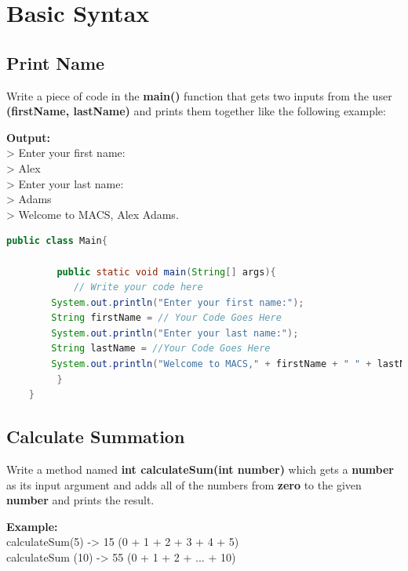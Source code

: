 \documentclass[12pt , a4paper]{article}
\newcommand{\hl}[1]{\colorbox{coolblack}{\color{cream}\textbf{#1}\color{black}}}
\begin{document}
\section{Basic Syntax}

	\subsection{Print Name}
Write a piece of code in the \textbf{main()} function that gets two inputs from the user \textbf{(firstName, lastName)} and prints them together like the following example:
 

	\begin{tcolorbox}
	\textbf{Output:}\\
	> Enter your first name:\\
	> Alex\\
	> Enter your last name:\\
	> Adams\\
	> Welcome to MACS, Alex Adams.
	\end{tcolorbox}

	\begin{lstlisting}[language=Java]
	public class Main{

	     public static void main(String[] args){
	        // Write your code here
		System.out.println("Enter your first name:");
		String firstName = // Your Code Goes Here 
		System.out.println("Enter your last name:");
		String lastName = //Your Code Goes Here
		System.out.println("Welcome to MACS," + firstName + " " + lastName);
	     }
	}
	\end{lstlisting}


	\newpage
	\subsection{Calculate Summation}
Write a method named \textbf{int calculateSum(int number)} which gets a \hl{number} as its input argument and adds all of the numbers from \textbf{zero} to the given \textbf{number} and prints the result.
	\begin{tcolorbox}
	\textbf{Example:}\\
	calculateSum(5) -> 15 (0 + 1 + 2 + 3 + 4 + 5)\\
	calculateSum (10) -> 55 (0 + 1 + 2 + ... + 10)
	\end{tcolorbox}
\end{document}

